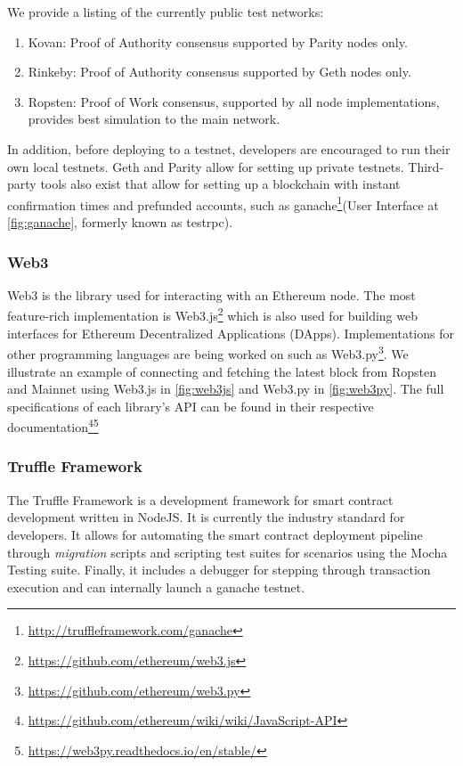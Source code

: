 We provide a listing of the currently public test networks:
\begin{enumerate}
    \item Kovan: Proof of Authority consensus supported by Parity nodes only.
    \item Rinkeby: Proof of Authority consensus supported by Geth nodes only.
    \item Ropsten: Proof of Work consensus, supported by all node implementations, provides best simulation to the main network.
\end{enumerate}

In addition, before deploying to a testnet, developers are encouraged to run their own local testnets. Geth and Parity allow for setting up private testnets. Third-party tools also exist that allow for setting up a blockchain with instant confirmation times and prefunded accounts, such as ganache\footnote{\url{http://truffleframework.com/ganache}}(User Interface at \ref{fig:ganache},  formerly known as testrpc).


\subsubsection{Web3}
Web3 is the library used for interacting with an Ethereum node. The most feature-rich implementation is Web3.js\footnote{\url{https://github.com/ethereum/web3.js}} which is also used for building web interfaces for Ethereum Decentralized Applications (DApps). Implementations for other programming languages are being worked on such as Web3.py\footnote{\url{https://github.com/ethereum/web3.py}}. We illustrate an example of connecting and fetching the latest block from Ropsten and Mainnet using Web3.js in \ref{fig:web3js} and Web3.py in \ref{fig:web3py}. The full specifications of each library's API can be found in their respective documentation\footnote{\url{https://github.com/ethereum/wiki/wiki/JavaScript-API}}\footnote{\url{https://web3py.readthedocs.io/en/stable/}}


\subsubsection{Truffle Framework}
The Truffle Framework is a development framework for smart contract development written in NodeJS. It is currently the industry standard for developers. It allows for automating the smart contract deployment pipeline through \textit{migration} scripts and scripting test suites for scenarios using the Mocha Testing suite. Finally, it includes a debugger for stepping through transaction execution and can internally launch a ganache testnet.

